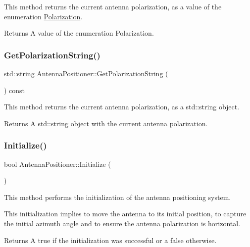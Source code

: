 This method returns the current antenna polarization, as a value of the enumeration \hyperlink{AntennaPositioning_8h_a55887c7bc32d70c0308472ff4de3e282}{Polarization}. 

\begin{DoxyReturn}{Returns}
A value of the enumeration \textquotesingle{}Polarization\textquotesingle{}. 
\end{DoxyReturn}
\mbox{\label{classAntennaPositioner_a897b759fa711bd8a4261e57177e3db1c}} 
\subsubsection{\texorpdfstring{Get\+Polarization\+String()}{GetPolarizationString()}}
{\footnotesize\ttfamily std\+::string Antenna\+Positioner\+::\+Get\+Polarization\+String (\begin{DoxyParamCaption}{ }\end{DoxyParamCaption}) const}



This method returns the current antenna polarization, as a {\ttfamily std\+::string} object. 

\begin{DoxyReturn}{Returns}
A {\ttfamily std\+::string} object with the current antenna polarization. 
\end{DoxyReturn}
\mbox{\label{classAntennaPositioner_a5087caa452709b33082c41b2cef2a23e}} 
\subsubsection{\texorpdfstring{Initialize()}{Initialize()}}
{\footnotesize\ttfamily bool Antenna\+Positioner\+::\+Initialize (\begin{DoxyParamCaption}{ }\end{DoxyParamCaption})}



This method performs the initialization of the antenna positioning system. 

This initialization implies to move the antenna to its initial position, to capture the initial azimuth angle and to ensure the antenna polarization is horizontal. \begin{DoxyReturn}{Returns}
A {\ttfamily true} if the initialization was successful or a {\ttfamily false} otherwise. 
\end{DoxyReturn}
\mbox{\label{classAntennaPositioner_a512104fe937395e266284eded6a8359d}} 
